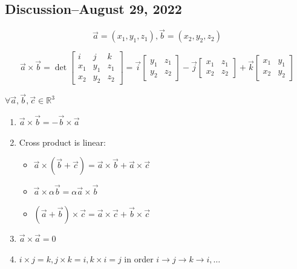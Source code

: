 \documentclass{scrreprt}
\begin{document}
\subsection{Discussion--August 29, 2022}

\begin{definition}
	\[
		\vec{a} = (x_1, y_1, z_1), \vec{b} = (x_2, y_2, z_2)
	\]

	\[
		\vec{a}\times \vec{b} = \det{\begin{bmatrix} i & j & k \\ x_1 & y_1 & z_1
                \\ x_2 & y_2 & z_2\end{bmatrix}}
		= \vec{i}\begin{bmatrix}
			y_1 & z_1 \\
			y_2 & z_2
		\end{bmatrix} - \vec{j}\begin{bmatrix}
			x_1 & z_1 \\
			x_2 & z_2
		\end{bmatrix} + \vec{k}\begin{bmatrix}
			x_1 & y_1 \\
			x_2 & y_2
		\end{bmatrix}
	\]

	$\forall \vec{a}, \vec{b}, \vec{c}\in \mathbb{R}^3$

	\begin{enumerate}
		\item $\vec{a}\times \vec{b} = -\vec{b}\times \vec{a}$
		\item Cross product is linear:
		      \begin{itemize}\item $\vec{a}\times (\vec{b} + \vec{c}) = \vec{a}\times \vec{b} + \vec{a}\times \vec{c}$
			      \item $\vec{a}\times \alpha \vec{b} = \alpha \vec{a}\times \vec{b}$
			      \item $(\vec{a}+\vec{b})\times \vec{c} = \vec{a}\times \vec{c} + \vec{b}\times \vec{c}$
		      \end{itemize}
		\item $\vec{a}\times \vec{a} = 0$
		\item $i\times j = k, j\times k = i, k\times i = j$ in order $i\rightarrow j \rightarrow k\rightarrow i, \ldots$
	\end{enumerate}
\end{definition}
\end{document}
